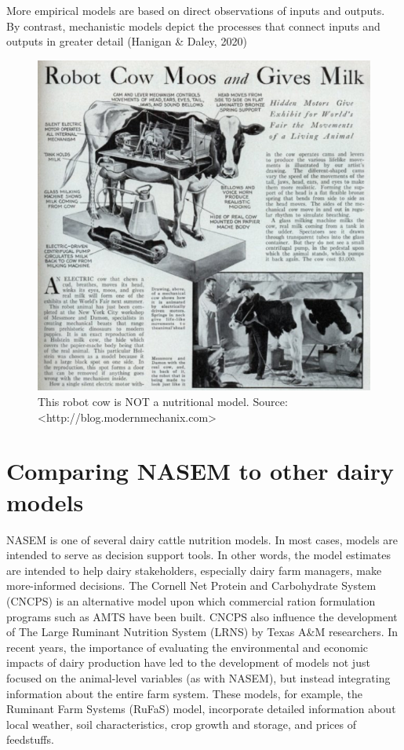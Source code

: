 \documentclass[
]{book}
\begin{document}
More empirical models are based on direct observations of inputs and outputs. By contrast, mechanistic models depict the processes that connect inputs and outputs in greater detail (Hanigan \& Daley, 2020)

\begin{figure}

{\centering \includegraphics[width=0.85\linewidth]{images/image-1217922456} 

}

\caption{This robot cow is NOT a nutritional model. Source: <http://blog.modernmechanix.com>}\label{fig:unnamed-chunk-9}
\end{figure}

\hypertarget{comparing-nasem--nasem8-to-other-dairy-models}{%
\section{\texorpdfstring{Comparing NASEM \citeyearpar{NASEM8} to other dairy models}{Comparing NASEM {[}-@NASEM8{]} to other dairy models}}\label{comparing-nasem--nasem8-to-other-dairy-models}}

NASEM \citeyearpar{NASEM8} is one of several dairy cattle nutrition models. In most cases, models are intended to serve as decision support tools. In other words, the model estimates are intended to help dairy stakeholders, especially dairy farm managers, make more-informed decisions. The Cornell Net Protein and Carbohydrate System (CNCPS) is an alternative model upon which commercial ration formulation programs such as AMTS have been built. CNCPS also influence the development of The Large Ruminant Nutrition System (LRNS) by Texas A\&M researchers. In recent years, the importance of evaluating the environmental and economic impacts of dairy production have led to the development of models not just focused on the animal-level variables (as with NASEM), but instead integrating information about the entire farm system. These models, for example, the Ruminant Farm Systems (RuFaS) model, incorporate detailed information about local weather, soil characteristics, crop growth and storage, and prices of feedstuffs.
\end{document}
